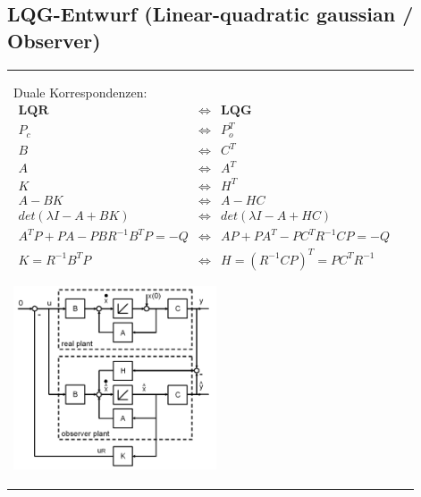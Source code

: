 \subsection{LQG-Entwurf (Linear-quadratic gaussian / Observer)}
	\begin{tabular}{ll}
		\parbox{12cm}{	Duale Korrespondenzen:\\
						\begin{eqnarray*}
						\textbf{LQR} &\Leftrightarrow& \textbf{LQG} \\
						P_c &\Leftrightarrow& P_o^T\\
						B &\Leftrightarrow& C^T\\
						A &\Leftrightarrow& A^T\\
						K &\Leftrightarrow& H^T\\
						A - BK &\Leftrightarrow& A - HC\\
						det(\lambda I-A+BK) &\Leftrightarrow& det(\lambda I-A+HC) \\
						A^T P + P A - P B R^{-1} B^T P = -Q &\Leftrightarrow& A P + P A^T - P C^T R^{-1} C P = -Q \\
						K=R^{-1} B^T P &\Leftrightarrow& H=(R^{-1} CP)^T = PC^TR^{-1}
						\end{eqnarray*}
					}
		\parbox{6cm}{\includegraphics[width=6cm]{./bilder/observer.png}}
	\end{tabular}\\
	
